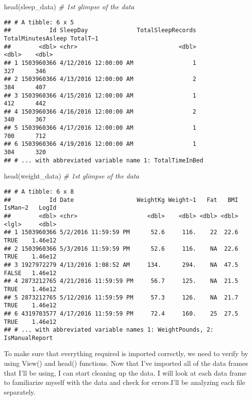 \documentclass[
]{article}
\newenvironment{Shaded}{\begin{snugshade}}{\end{snugshade}}
\newcommand{\CommentTok}[1]{\textcolor[rgb]{0.56,0.35,0.01}{\textit{#1}}}
\newcommand{\FunctionTok}[1]{\textcolor[rgb]{0.00,0.00,0.00}{#1}}
\newcommand{\NormalTok}[1]{#1}
\begin{document}
\begin{Shaded}
\begin{Highlighting}[]
     \FunctionTok{head}\NormalTok{(sleep\_data) }\CommentTok{\# 1st glimpse of the data}
\end{Highlighting}
\end{Shaded}

\begin{verbatim}
## # A tibble: 6 x 5
##           Id SleepDay              TotalSleepRecords TotalMinutesAsleep TotalT~1
##        <dbl> <chr>                             <dbl>              <dbl>    <dbl>
## 1 1503960366 4/12/2016 12:00:00 AM                 1                327      346
## 2 1503960366 4/13/2016 12:00:00 AM                 2                384      407
## 3 1503960366 4/15/2016 12:00:00 AM                 1                412      442
## 4 1503960366 4/16/2016 12:00:00 AM                 2                340      367
## 5 1503960366 4/17/2016 12:00:00 AM                 1                700      712
## 6 1503960366 4/19/2016 12:00:00 AM                 1                304      320
## # ... with abbreviated variable name 1: TotalTimeInBed
\end{verbatim}

\begin{Shaded}
\begin{Highlighting}[]
     \FunctionTok{head}\NormalTok{(weight\_data) }\CommentTok{\# 1st glimpse of the data}
\end{Highlighting}
\end{Shaded}

\begin{verbatim}
## # A tibble: 6 x 8
##           Id Date                  WeightKg Weight~1   Fat   BMI IsMan~2   LogId
##        <dbl> <chr>                    <dbl>    <dbl> <dbl> <dbl> <lgl>     <dbl>
## 1 1503960366 5/2/2016 11:59:59 PM      52.6     116.    22  22.6 TRUE    1.46e12
## 2 1503960366 5/3/2016 11:59:59 PM      52.6     116.    NA  22.6 TRUE    1.46e12
## 3 1927972279 4/13/2016 1:08:52 AM     134.      294.    NA  47.5 FALSE   1.46e12
## 4 2873212765 4/21/2016 11:59:59 PM     56.7     125.    NA  21.5 TRUE    1.46e12
## 5 2873212765 5/12/2016 11:59:59 PM     57.3     126.    NA  21.7 TRUE    1.46e12
## 6 4319703577 4/17/2016 11:59:59 PM     72.4     160.    25  27.5 TRUE    1.46e12
## # ... with abbreviated variable names 1: WeightPounds, 2: IsManualReport
\end{verbatim}

To make sure that everything required is imported correctly, we need to
verify by using View() and head() functions. Now that I've imported all
of the data frames that I'll be using, I can start cleaning up the data.
I will look at each data frame to familiarize myself with the data and
check for errors.I'll be analyzing each file separately.
\end{document}

